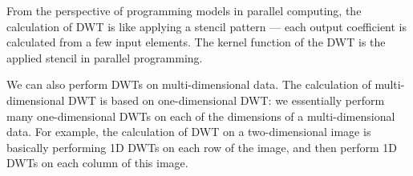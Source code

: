 From the perspective of programming models in parallel computing, 
the calculation of DWT is like applying a stencil pattern --- 
each output coefficient is calculated from a few input elements. 
%
The kernel function of the DWT is the applied stencil in parallel programming.


We can also perform DWTs on multi-dimensional data.
%
The calculation of multi-dimensional DWT is based on one-dimensional DWT:
we essentially perform many one-dimensional DWTs on each of the dimensions
of a multi-dimensional data.
%
For example, the calculation of DWT on a two-dimensional image is basically 
performing 1D DWTs on each row of the image, and then perform 1D DWTs on 
each column of this image.



